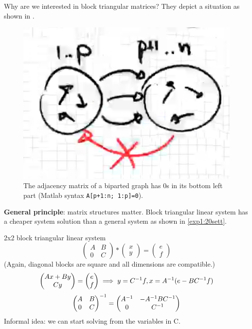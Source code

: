 \documentclass[computationalMathematics.tex]{subfiles}
\begin{document}
Why are we interested in block triangular matrices? They depict a situation as shown in .
\begin{figure}[H]
    \centering
    \includegraphics[scale=1]{pics/20sett/1.png}
    \caption{The adjacency matrix of a biparted graph has $0$s in its bottom left part (Matlab syntax \texttt{A[p+1:n; 1:p]=0}).}
    \label{fig:20sett3}
\end{figure}

\textbf{General principle}: matrix structures matter. Block triangular linear system has a cheaper system solution than a general system as shown in \cref{exp1:20sett}.
\begin{example}
\label{exp1:20sett}
2x2 block triangular linear system\\
$$
\begin{pmatrix}
    A & B\\
    0 & C
\end{pmatrix}*
\begin{pmatrix}
    x \\
    y 
\end{pmatrix} = 
\begin{pmatrix}
    e \\
    f 
\end{pmatrix}
$$
(Again, diagonal blocks are square and all dimensions are
compatible.)
$$
\begin{pmatrix}
    Ax + By\\
    Cy
\end{pmatrix} = 
\begin{pmatrix}
    e \\
    f 
\end{pmatrix}\implies y = {C}^{-1}f, x = {A}^{-1}(e - B{C}^{-1}f)
$$
$$
\begin{pmatrix}
    A & B\\
    0 & C
\end{pmatrix}^{-1} = 
\begin{pmatrix}
          {A}^{-1} & -{A}^{-1}B{C}^{-1}\\
          0 & {C}^{-1}
        \end{pmatrix}
$$
Informal idea: we can start solving from the variables in C.
\end{example}
\end{document}
